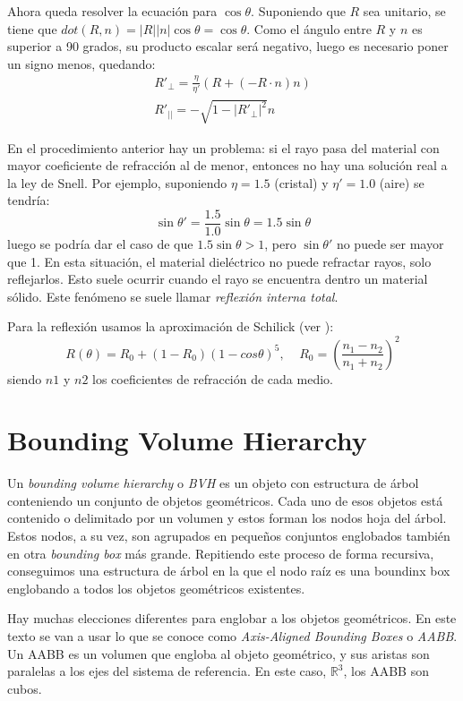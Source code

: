 \documentclass[12pt]{article}
\theoremstyle{definition}
\theoremstyle{remark}
\begin{document}
Ahora queda resolver la ecuación para $\cos\theta$. Suponiendo que $R$ sea unitario, se tiene que $dot(R,n)=|R||n|\cos\theta=\cos\theta$. Como el ángulo entre $R$ y $n$ es superior a 90 grados, su producto escalar será negativo, luego es necesario poner un signo menos, quedando:
\[
\begin{array}{ll}
R'_{\perp}=\frac{\eta}{\eta'}(R+(-R\cdot n)n)\\
R'_{||}=-\sqrt{1-|R'_{\perp}|^2}n
\end{array}
\]

En el procedimiento anterior hay un problema: si el rayo pasa del material con mayor coeficiente de refracción al de menor, entonces no hay una solución real a la ley de Snell. Por ejemplo, suponiendo $\eta=1.5$ (cristal) y $\eta'=1.0$ (aire) se tendría:
\[
\sin\theta'=\frac{1.5}{1.0}\sin\theta=1.5\sin\theta
\]
luego se podría dar el caso de que $1.5\sin\theta>1$, pero $\sin\theta'$ no puede ser mayor que 1. En esta situación, el material dieléctrico no puede refractar rayos, solo reflejarlos. Esto suele ocurrir cuando el rayo se encuentra dentro un material sólido. Este fenómeno se suele llamar \textit{reflexión interna total}.

Para la reflexión usamos la aproximación de Schilick (ver \cite{schlickapproximation}):
\[
R(\theta)=R_0+(1-R_0)(1-cos\theta)^5, \;\;\;\; R_0=\left(\frac{n_1-n_2}{n_1+n_2}\right)^2
\]
siendo $n1$ y $n2$ los coeficientes de refracción de cada medio.

\section{Bounding Volume Hierarchy}

Un \textit{bounding volume hierarchy} o \textit{BVH} es un objeto con estructura de árbol conteniendo un conjunto de objetos geométricos. Cada uno de esos objetos está contenido o delimitado por un volumen y estos forman los nodos hoja del árbol. Estos nodos, a su vez, son agrupados en pequeños conjuntos englobados también en otra \textit{bounding box} más grande. Repitiendo este proceso de forma recursiva, conseguimos una estructura de árbol en la que el nodo raíz es una boundinx box englobando a todos los objetos geométricos existentes.

Hay muchas elecciones diferentes para englobar a los objetos geométricos. En este texto se van a usar lo que se conoce como \textit{Axis-Aligned Bounding Boxes} o \textit{AABB}. Un AABB es un volumen que engloba al objeto geométrico, y sus aristas son paralelas a los ejes del sistema de referencia. En este caso, $\mathbb{R}^3$, los AABB son cubos.
\end{document}
